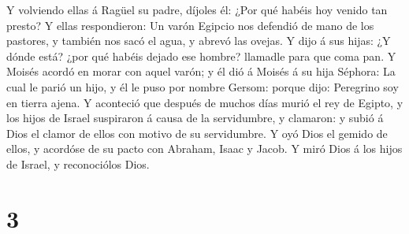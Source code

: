  Y volviendo ellas á Ragüel su padre, díjoles él: ¿Por qué
habéis hoy venido tan presto?  Y ellas respondieron: Un
varón Egipcio nos defendió de mano de los pastores, y también nos sacó
el agua, y abrevó las ovejas.  Y dijo á sus hijas: ¿Y dónde
está? ¿por qué habéis dejado ese hombre? llamadle para que coma pan.
 Y Moisés acordó en morar con aquel varón; y él dió á
Moisés á su hija Séphora:  La cual le parió un hijo, y él
le puso por nombre Gersom: porque dijo: Peregrino soy en tierra ajena.
 Y aconteció que después de muchos días murió el rey de
Egipto, y los hijos de Israel suspiraron á causa de la servidumbre, y
clamaron: y subió á Dios el clamor de ellos con motivo de su
servidumbre.  Y oyó Dios el gemido de ellos, y acordóse de
su pacto con Abraham, Isaac y Jacob.  Y miró Dios á los
hijos de Israel, y reconociólos Dios.

\hypertarget{section-2}{%
\section{3}\label{section-2}}

